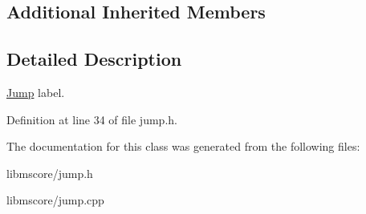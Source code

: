 \subsection*{Additional Inherited Members}


\subsection{Detailed Description}
\hyperlink{class_ms_1_1_jump}{Jump} label. 

Definition at line 34 of file jump.\+h.



The documentation for this class was generated from the following files\+:\begin{DoxyCompactItemize}
\item 
libmscore/jump.\+h\item 
libmscore/jump.\+cpp\end{DoxyCompactItemize}
